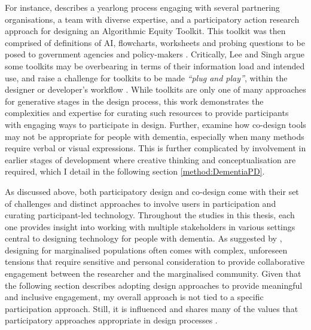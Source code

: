 For instance, \citep{krafft2021action} describes a yearlong process engaging with several partnering organisations, a team with diverse expertise, and a participatory action research approach for designing an Algorithmic Equity Toolkit. This toolkit was then comprised of definitions of AI, flowcharts, worksheets and probing questions to be posed to government agencies and policy-makers \citep{katell2020toward}. Critically, Lee and Singh argue some toolkits may be overbearing in terms of their information load and intended use, and raise a challenge for toolkits to be made \textit{``plug and play''}, within the designer or developer's workflow \citep{lee2021landscape}. While toolkits are only one of many approaches for generative stages in the design process, this work demonstrates the complexities and expertise for curating such resources to provide participants with engaging ways to participate in design. Further, \cite{hendriks_challenges_2014} examine how co-design tools may not be appropriate for people with dementia, especially when many methods require verbal or visual expressions. This is further complicated by involvement in earlier stages of development where creative thinking and conceptualisation are required, which I detail in the following section \ref{method:DementiaPD}.

As discussed above, both participatory design and co-design come with their set of challenges and distinct approaches to involve users in participation and curating participant-led technology. Throughout the studies in this thesis, each one provides insight into working with multiple stakeholders in various settings central to designing technology for people with dementia. As suggested by \cite{harrington_deconstructing_2019}, designing for marginalised populations often comes with complex, unforeseen tensions that require sensitive and personal consideration to provide collaborative engagement between the researcher and the marginalised community. Given that the following section describes adopting design approaches to provide meaningful and inclusive engagement, my overall approach is not tied to a specific participation approach. Still, it is influenced and shares many of the values that participatory approaches appropriate in design processes \citep{hansen2019participatory}.



